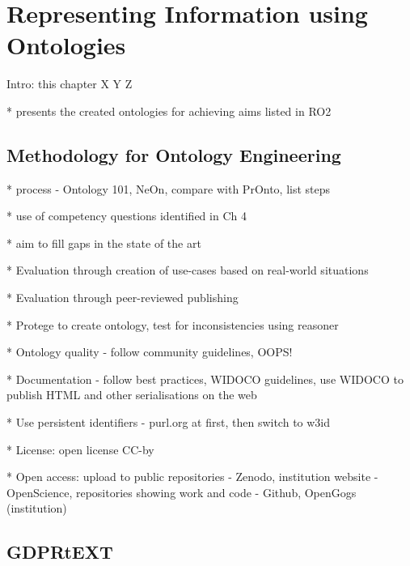 \chapter{Representing Information using Ontologies}
\label{chapter:vocabularies}

Intro: this chapter X Y Z

* presents the created ontologies for achieving aims listed in RO2

\section{Methodology for Ontology Engineering}\label{sec:voc:methodology}

* process - Ontology 101, NeOn, compare with PrOnto, list steps

* use of competency questions identified in Ch 4

* aim to fill gaps in the state of the art

* Evaluation through creation of use-cases based on real-world situations

* Evaluation through peer-reviewed publishing

* Protege to create ontology, test for inconsistencies using reasoner

* Ontology quality - follow community guidelines, OOPS!

* Documentation - follow best practices, WIDOCO guidelines, use WIDOCO to publish HTML and other serialisations on the web

* Use persistent identifiers - purl.org at first, then switch to w3id

* License: open license CC-by

* Open access: upload to public repositories - Zenodo, institution website - OpenScience, repositories showing work and code - Github, OpenGogs (institution)

\section{GDPRtEXT}\label{sec:voc:GDPRtEXT}

